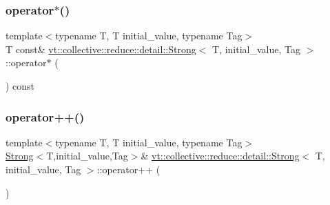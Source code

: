 \mbox{\label{structvt_1_1collective_1_1reduce_1_1detail_1_1_strong_abddd678b81243106268873116676f135}} 
\subsubsection{\texorpdfstring{operator$\ast$()}{operator*()}\hspace{0.1cm}{\footnotesize\ttfamily [2/2]}}
{\footnotesize\ttfamily template$<$typename T, T initial\+\_\+value, typename Tag$>$ \\
T const\& \hyperlink{structvt_1_1collective_1_1reduce_1_1detail_1_1_strong}{vt\+::collective\+::reduce\+::detail\+::\+Strong}$<$ T, initial\+\_\+value, Tag $>$\+::operator$\ast$ (\begin{DoxyParamCaption}{ }\end{DoxyParamCaption}) const\hspace{0.3cm}{\ttfamily [inline]}}

\mbox{\label{structvt_1_1collective_1_1reduce_1_1detail_1_1_strong_a403ac1145637bfab0550181b5f7bdd5f}} 
\subsubsection{\texorpdfstring{operator++()}{operator++()}}
{\footnotesize\ttfamily template$<$typename T, T initial\+\_\+value, typename Tag$>$ \\
\hyperlink{structvt_1_1collective_1_1reduce_1_1detail_1_1_strong}{Strong}$<$T,initial\+\_\+value,Tag$>$\& \hyperlink{structvt_1_1collective_1_1reduce_1_1detail_1_1_strong}{vt\+::collective\+::reduce\+::detail\+::\+Strong}$<$ T, initial\+\_\+value, Tag $>$\+::operator++ (\begin{DoxyParamCaption}{ }\end{DoxyParamCaption})\hspace{0.3cm}{\ttfamily [inline]}}

